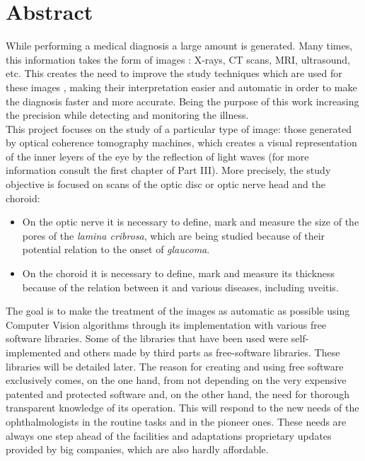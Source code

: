 \chapter*{Abstract}
While performing a medical diagnosis a large amount is generated. Many
times, this information takes the form of images \emph{\citep*[1. The
  Analysis of Medical Images, 2. Digital Image
  Acquisition]{toennies2012guide}}: X-rays, CT scans, MRI, ultrasound,
etc. This creates the need to improve the study techniques which are
used for these images \emph{\citep*[4. Image
  Enhancement]{toennies2012guide}}, making their interpretation easier
and automatic in order to make the diagnosis faster and more
accurate. Being the purpose of this work increasing the precision
while detecting and monitoring the illness.\\
This project focuses on the study of a particular type of image: those
generated by optical coherence tomography machines, which creates a
visual representation of the inner leyers of the eye by the reflection
of light waves (for more information consult the first chapter of Part
III). More precisely, the study objective is focused on scans of the
optic disc or optic nerve head and the choroid:
\begin{itemize}
\item On the optic nerve it is necessary to define, mark and measure
  the size of the pores of the \emph{lamina cribrosa}, which are being
  studied because of their potential relation to the onset of \emph{glaucoma}.
\item On the choroid it is necessary to define, mark and measure its
  thickness because of the relation between it and various diseases,
  including uveitis.
\end{itemize}
The goal is to make the treatment of the images as automatic as
possible using Computer Vision algorithms through its implementation
with various free software libraries. Some of the libraries that have
been used were self-implemented and others made by third parts as
free-software libraries. These libraries will be detailed later. The
reason for creating and using free software exclusively comes, on the
one hand, from not depending on the very expensive patented and protected
software and, on the other hand, the need for thorough transparent
knowledge of its operation. This will respond to the new needs of the
ophthalmologists in the routine tasks and in the pioneer ones. These needs 
are always one step ahead of the
facilities and adaptations proprietary updates provided by big
companies, which are also hardly affordable.